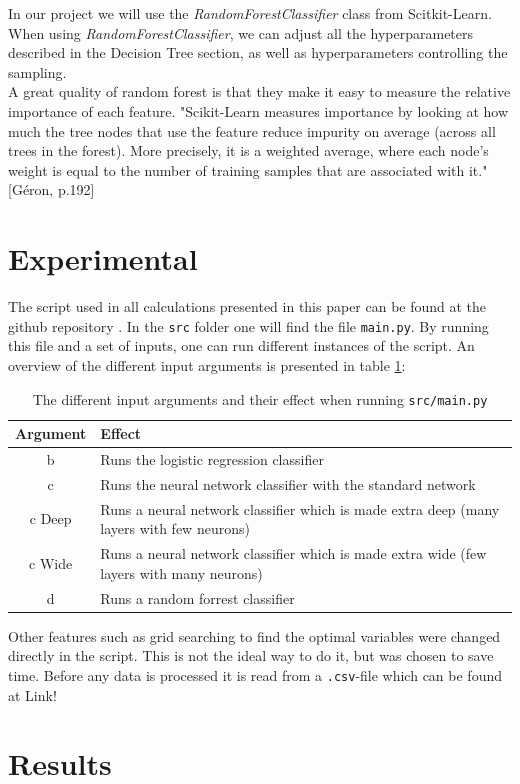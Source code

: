 \documentclass[12pt]{article}
\numberwithin{figure}{section}
\newcommand{\husk}[1]{\color{red} #1 \color{black}}
\begin{document}
In our project we will use the \textit{RandomForestClassifier} class from Scitkit-Learn. When using \textit{RandomForestClassifier}, we can adjust all the hyperparameters described in the Decision Tree section, as well as hyperparameters controlling the sampling.\\
A great quality of random forest is that they make it easy to measure the relative importance of each feature. "Scikit-Learn measures importance by looking at how much the tree nodes that use the feature reduce impurity on average (across all trees in the forest). More precisely, it is a weighted average, where each node's weight is equal to the number of training samples that are associated with it." \husk{[Géron, p.192]} 

\section{Experimental}
The script used in all calculations presented in this paper can be found at the github repository \cite{github}. In the \texttt{src} folder one will find the file \texttt{main.py}. By running this file and a set of inputs, one can run different instances of the script. An overview of the different input arguments is presented in table \ref{tabE:sysargv}:
\begin{table}[H]
\centering
\begin{tabular}{c|p{10cm}}
Argument & Effect \\ \hline
b & Runs the logistic regression classifier \\ \hline
c & Runs the neural network classifier with the standard network \\ \hline
c Deep & Runs a neural network classifier which is made extra deep (many layers with few neurons) \\ \hline
c Wide & Runs a neural network classifier which is made extra wide (few layers with many neurons) \\ \hline
d & Runs a random forrest classifier
\end{tabular}
\caption{The different input arguments and their effect when running \texttt{src/main.py}}
\label{tabE:sysargv}
\end{table}
Other features such as grid searching to find the optimal variables were changed directly in the script. This is not the ideal way to do it, but was chosen to save time.
Before any data is processed it is read from a \texttt{.csv}-file which can be found at \husk{Link!}
\section{Results}
\end{document}
